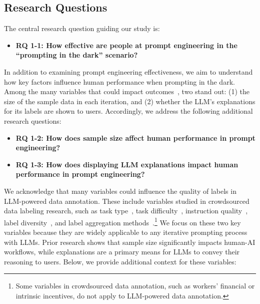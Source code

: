 \subsection{Research Questions\label{sec:rq}}

The central research question guiding our study is:

\begin{itemize}
    \item \textbf{RQ 1-1: How effective are people at prompt engineering in the ``prompting in the dark'' scenario?}
\end{itemize}

In addition to examining prompt engineering effectiveness, we aim to understand how key factors influence human performance when prompting in the dark. 
Among the many variables that could impact outcomes~\cite{kulesza2012tell}, two stand out:
(1) the size of the sample data in each iteration, and 
(2) whether the LLM's explanations for its labels are shown to users.
Accordingly, we address the following additional research questions:

\begin{itemize}
    \item \textbf{RQ 1-2: How does sample size affect human performance in prompt engineering?}
    \item \textbf{RQ 1-3: How does displaying LLM explanations impact human performance in prompt engineering?}
\end{itemize}

We acknowledge that many variables could influence the quality of labels in LLM-powered data annotation. 
These include variables studied in crowdsourced data labeling research, such as 
task type~\cite{hettiachchi2022survey, zhen2021crowdsourcing}, %
task difficulty~\cite{zheng2022virtual, zhang2021personalized}, 
instruction quality~\cite{zamfirescu2023herding, zhang2023llmaaa}, 
label diversity~\cite{kazai2012face}, and 
label aggregation methods~\cite{drutsa2020crowdsourcing, li2024comparative}.\footnote{Some variables in crowdsourced data annotation, such as workers' financial or intrinsic incentives, do not apply to LLM-powered data annotation.}
We focus on these two key variables because they are widely applicable to any iterative prompting process with LLMs. Prior research shows that sample size significantly impacts human-AI workflows, while explanations are a primary means for LLMs to convey their reasoning to users.
Below, we provide additional context for these variables:


